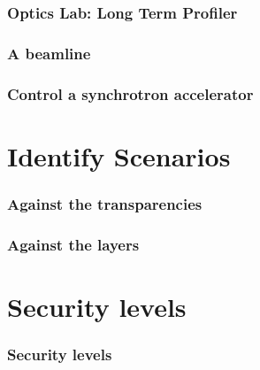 \documentclass{beamer}
\begin{document}
\begin{frame}
\frametitle{Optics Lab: Long Term Profiler}
\end{frame}

\begin{frame}
\frametitle{A beamline}
\end{frame}

\begin{frame}
\frametitle{Control a synchrotron accelerator}
\end{frame}

\section{Identify Scenarios}


\begin{frame}
\frametitle{Against the transparencies}
\end{frame}

\begin{frame}
\frametitle{Against the layers}
\end{frame}

\section{Security levels}

\begin{frame}
\frametitle{Security levels}
\end{frame}
\end{document}
